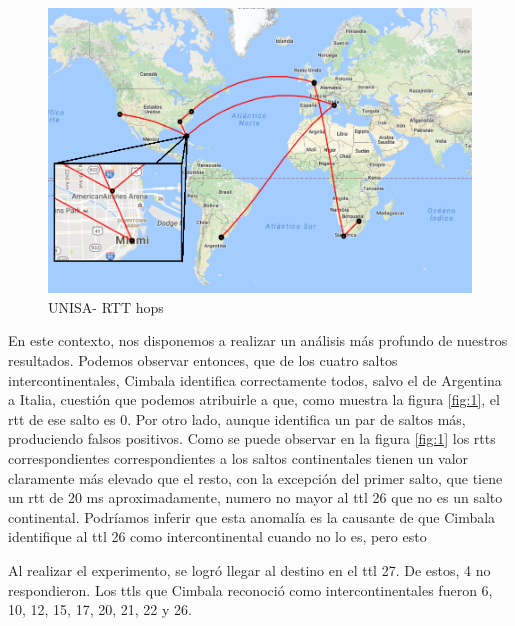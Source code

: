 \newpage

\begin{figure}[!htbp]
  \centering
    \includegraphics[scale=0.6]{imagenes/unisa-graficos/mapa-unisa.png}
  \caption{UNISA- RTT hops}
  \label{mapa-unisa}
\end{figure}

En este contexto, nos disponemos a realizar un análisis más profundo de nuestros resultados. Podemos observar entonces, que de los cuatro saltos intercontinentales, Cimbala identifica correctamente todos, salvo el de Argentina a Italia, cuestión que podemos atribuirle a que, como muestra la figura \ref{fig:1}, el rtt de ese salto es 0. Por otro lado, 
 aunque identifica un par de saltos más, produciendo falsos positivos. Como se puede observar en la figura \ref{fig:1} los rtts correspondientes correspondientes a los saltos continentales tienen un valor claramente más elevado que el resto, con la excepción del primer salto, que tiene un rtt de 20 ms aproximadamente, numero no mayor al ttl 26 que no es un salto continental. Podríamos inferir que esta anomalía es la causante de que Cimbala identifique al ttl 26 como intercontinental cuando no lo es, pero esto

Al realizar el experimento, se logró llegar al destino en el ttl 27. De estos, 4 no respondieron. Los ttls que Cimbala reconoció como intercontinentales fueron 6, 10, 12, 15, 17, 20, 21, 22 y 26.

